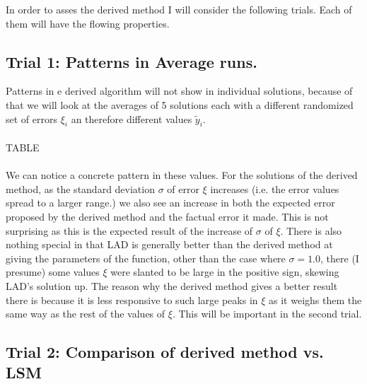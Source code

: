 \documentclass[11pt,a4paper]{article}
\numberwithin{equation}{subsection}
\begin{document}
In order to asses the derived method I will consider the following trials. Each of them will have the flowing properties. 
\subsection{Trial 1: Patterns in Average runs.}
Patterns in e derived algorithm will not show in individual solutions, because of that we will look at the averages of 5 solutions each with a different randomized set of errors $\xi_i$ an therefore different values $\tilde{y}_i$.\\
\\
TABLE\\
\\
We can notice a concrete pattern in these values. For the solutions of the derived method, as the standard deviation $\sigma$ of error $\xi$ increases (i.e. the error values spread to a larger range.) we also see an increase in both the expected error proposed by the derived method and the factual error it made. This is not surprising as this is the expected result of the increase of $\sigma$ of $\xi$. There is also nothing special in that LAD is generally better than the derived method at giving the parameters of the function, other than the case where $\sigma = 1.0$, there (I presume) some values $\xi$ were slanted to be large in the positive sign, skewing LAD's solution up. The reason why the derived method gives a better result there is because it is less responsive to such large peaks in $\xi$ as it weighs them the same way as the rest of the values of $\xi$. This will be important in the second trial.

\subsection{Trial 2: Comparison of derived method vs. LSM}
\end{document}
